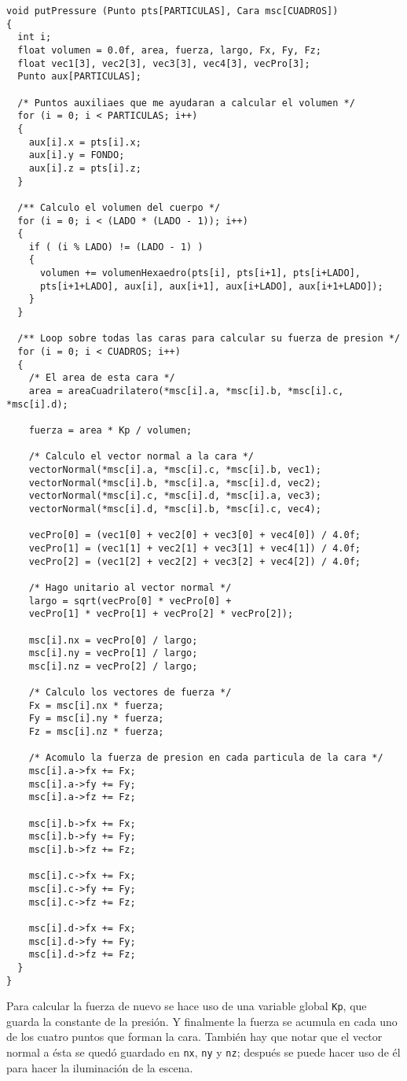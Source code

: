 \begin{verbatim}
void putPressure (Punto pts[PARTICULAS], Cara msc[CUADROS])
{
  int i;
  float volumen = 0.0f, area, fuerza, largo, Fx, Fy, Fz;
  float vec1[3], vec2[3], vec3[3], vec4[3], vecPro[3];
  Punto aux[PARTICULAS];

  /* Puntos auxiliaes que me ayudaran a calcular el volumen */
  for (i = 0; i < PARTICULAS; i++)
  {
    aux[i].x = pts[i].x;
    aux[i].y = FONDO;
    aux[i].z = pts[i].z;
  }

  /** Calculo el volumen del cuerpo */
  for (i = 0; i < (LADO * (LADO - 1)); i++)
  {
    if ( (i % LADO) != (LADO - 1) )
    {
      volumen += volumenHexaedro(pts[i], pts[i+1], pts[i+LADO], 
      pts[i+1+LADO], aux[i], aux[i+1], aux[i+LADO], aux[i+1+LADO]);
    }
  }

  /** Loop sobre todas las caras para calcular su fuerza de presion */
  for (i = 0; i < CUADROS; i++)
  {
    /* El area de esta cara */
    area = areaCuadrilatero(*msc[i].a, *msc[i].b, *msc[i].c, *msc[i].d);

    fuerza = area * Kp / volumen;

    /* Calculo el vector normal a la cara */
    vectorNormal(*msc[i].a, *msc[i].c, *msc[i].b, vec1);
    vectorNormal(*msc[i].b, *msc[i].a, *msc[i].d, vec2);
    vectorNormal(*msc[i].c, *msc[i].d, *msc[i].a, vec3);
    vectorNormal(*msc[i].d, *msc[i].b, *msc[i].c, vec4);

    vecPro[0] = (vec1[0] + vec2[0] + vec3[0] + vec4[0]) / 4.0f;
    vecPro[1] = (vec1[1] + vec2[1] + vec3[1] + vec4[1]) / 4.0f;
    vecPro[2] = (vec1[2] + vec2[2] + vec3[2] + vec4[2]) / 4.0f;

    /* Hago unitario al vector normal */
    largo = sqrt(vecPro[0] * vecPro[0] + 
    vecPro[1] * vecPro[1] + vecPro[2] * vecPro[2]);

    msc[i].nx = vecPro[0] / largo;
    msc[i].ny = vecPro[1] / largo;
    msc[i].nz = vecPro[2] / largo;

    /* Calculo los vectores de fuerza */
    Fx = msc[i].nx * fuerza;
    Fy = msc[i].ny * fuerza;
    Fz = msc[i].nz * fuerza;

    /* Acomulo la fuerza de presion en cada particula de la cara */
    msc[i].a->fx += Fx;
    msc[i].a->fy += Fy;
    msc[i].a->fz += Fz;

    msc[i].b->fx += Fx;
    msc[i].b->fy += Fy;
    msc[i].b->fz += Fz;

    msc[i].c->fx += Fx;
    msc[i].c->fy += Fy;
    msc[i].c->fz += Fz;

    msc[i].d->fx += Fx;
    msc[i].d->fy += Fy;
    msc[i].d->fz += Fz;
  }
}
\end{verbatim}
Para calcular la fuerza de nuevo se hace uso de una variable global \verb|Kp|, que guarda la constante de la presión. Y finalmente la fuerza se acumula en cada uno de los cuatro puntos que forman la cara. También hay que notar que el vector normal a ésta se quedó guardado en \verb|nx|, \verb|ny| y \verb|nz|; después se puede hacer uso de él para hacer la iluminación de la escena.

